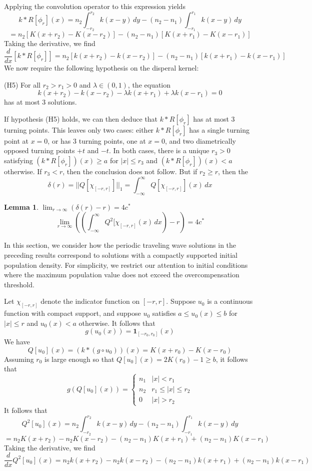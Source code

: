 \documentclass[11pt]{article}
\newtheorem{lem}[thm]{Lemma}
\theoremstyle{definition}
\numberwithin{equation}{section}
\numberwithin{thm}{section}
\renewcommand{\a}{a}
\renewcommand{\b}{b}
\begin{document}
Applying the convolution operator to this expression yields
$$ k*R[\phi_r] (x) = n_2 \int_{-r_2}^{r_2} k(x-y)\,dy - (n_2-n_1) \int_{-r_1}^{r_1} k(x-y) \, dy $$
$$ = n_2 \left[ K(x+r_2) - K(x-r_2)  \right] - (n_2-n_1) \left[ K(x+r_1) - K(x-r_1) \right] $$
Taking the derivative, we find
$$ \frac{d}{dx} \left[ k*R[\phi_r] \right] = n_2 \left[ k(x+r_2) - k(x-r_2)  \right] - (n_2-n_1) \left[ k(x+r_1) - k(x-r_1)\right] $$
We now require the following hypothesis on the disperal kernel:

(H5) For all $r_2>r_1>0$ and $\lambda \in (0,1)$, the equation
$$ k(x+r_2) - k(x-r_2) - \lambda k(x+r_1) + \lambda k(x-r_1) = 0 $$
has at most 3 solutions.

If hypothesis (H5) holds, we can then deduce that $k*R[\phi_r]$ has at most 3 turning points. This leaves only two cases: either $k*R[\phi_r]$ has a single turning point at $x=0$, or has 3 turning points, one at $x=0$, and two diametrically opposed turning points $+t$ and $-t$. In both cases, there is a unique $r_3>0$ satisfying $(k*R[\phi_r])(x) \geq \a$ for $|x| \leq r_3$ and $(k*R[\phi_r])(x) < \a$ otherwise. If $r_3 < r$, then the conclusion does not follow. But if $r_2 \geq r$, then the 
$$
\delta (r) = || Q[\chi_{[-r,r]}] ||_1 = \int_{-\infty}^{\infty} Q[\chi_{[-r,r]}](x) \, dx
$$

\begin{lem}
$ \lim_{r \to \infty} ( \delta(r) - r ) = 4c^* $
\begin{equation}
\lim_{r\to\infty} \left( \left( \int_{-\infty}^{\infty}Q^2[\chi_{[-r,r]}(x) \, dx \right) -r \right) = 4c^* 
\end{equation}
\end{lem}

In this section, we consider how the periodic traveling wave solutions in the preceding results correspond to solutions with a compactly supported initial population density. For simplicity, we restrict our attention to initial conditions where the maximum population value does not exceed the overcompensation threshold.

Let $\chi_{[-r,r]}$ denote the indicator function on $[-r,r]$. Suppose $u_0$ is a continuous function with compact support, and suppose $u_0$ satisfies $\a \leq u_0(x) \leq \b$ for $|x| \leq r$ and $u_0(x) < \a$ otherwise. It follows that
$$ g(u_0(x)) = \mathbf 1_{[-r_0,r_0]}(x) $$
We have
$$ Q[u_0](x) = (k*(g \circ u_0))(x) = K(x+r_0) - K(x-r_0) $$
Assuming $r_0$ is large enough so that $ Q[u_0](x) = 2K(r_0)-1 \geq \b$, it follows that
$$ g(Q[u_0](x)) = \begin{cases}
n_1 & |x| < r_1 \\
n_2 & r_1 \leq |x| \leq r_2 \\
0 & |x| > r_2
\end{cases} $$
It follows that
$$ Q^2 [u_0] (x) = n_2 \int_{-r_2}^{r_2} k(x-y)\,dy - (n_2-n_1) \int_{-r_1}^{r_1} k(x-y) \, dy $$
$$ = n_2 K(x+r_2) - n_2K(x-r_2) - (n_2-n_1) K(x+r_1) + (n_2-n_1) K(x-r_1) $$
Taking the derivative, we find
$$ \frac{d}{dx} Q^2 [u_0](x) = n_2 k(x+r_2) - n_2k(x-r_2) - (n_2-n_1) k(x+r_1) + (n_2-n_1) k(x-r_1) $$
\end{document}
